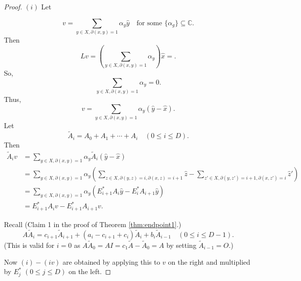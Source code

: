 \documentclass[
]{book}
\theoremstyle{definition}
\theoremstyle{definition}
\theoremstyle{definition}
\theoremstyle{definition}
\theoremstyle{remark}
\begin{document}
\begin{proof}
\leavevmode

\((i)\) Let

\[v = \sum_{y\in X, \partial(x,y)=1}\alpha_y \hat{y} \quad \text{for some }\{\alpha_g\}\subseteq \mathbb{C}.\]
Then
\[Lv = \left(\sum_{y\in X, \partial(x,y)=1}\alpha_y\right)\hat{x} = .\]
So,
\[\sum_{y\in X, \partial(x,y)=1}\alpha_y = 0.\]
Thus,
\[v = \sum_{y\in X, \partial(x,y)=1}\alpha_y(\hat{y}-\hat{x}).\]
Let
\[\tilde{A}_i = A_0 + A_1 + \cdots + A_i \quad (0\leq i\leq D).\]
Then
\begin{align}
\tilde{A}_iv & = \sum_{y\in X, \partial(x,y)=1}\alpha_y \tilde{A}_i(\hat{y}-\hat{x})\\
& = \sum_{y\in X, \partial(x,y)=1}\alpha_y\left(\sum_{z\in X, \partial(y,z)=i, \partial(x,z)=i+1}\hat{z}-\sum_{z'\in X, \partial(y,z')=i+1, \partial(x,z')=i}\hat{z}'\right)\\
& = \sum_{y\in X, \partial(x,y)=1}\alpha_y(E^*_{i+1}A_i\hat{y}- E^*_iA_{i+1}\hat{y})\\
& = E^*_{i+1}A_iv - E^*_{i+1}A_{i+1}v.
\end{align}

Recall (Claim 1 in the proof of Theorem \ref{thm:endpoint1}.)
\[A\tilde{A}_i = c_{i+1}\tilde{A}_{i+1}+ (a_i-c_{i+1}+c_i)\tilde{A}_i + b_i\tilde{A}_{i-1}\quad (0\leq i\leq D-1).\]
(This is valid for \(i=0\) as \(A\tilde{A}_0 = AI = c_1\tilde{A}- \tilde{A}_0 = A\) by setting \(\tilde{A}_{i-1} = O\).)

Now \((i)-(iv)\) are obtained by applying this to \(v\) on the right and multiplied by \(E^*_j\) \((0\leq j\leq D)\) on the left.

\end{proof}
\end{document}
